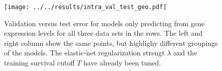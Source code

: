 \begin{figure}
    \centering
    \texttt{[image: ../../results/intra\_val\_test\_geo.pdf]}
    \caption{Validation versus test error for models only predicting from gene expression levels for all 
        three data sets in the rows. The left and right column show the same points, but highlighy 
        different groupings of the models. The elastic-net regularization strengt $\lambda$ and the 
        training survival cutoff $T$ have already been tuned.}
    \label{fig:val_test_geo_lamis}
\end{figure}